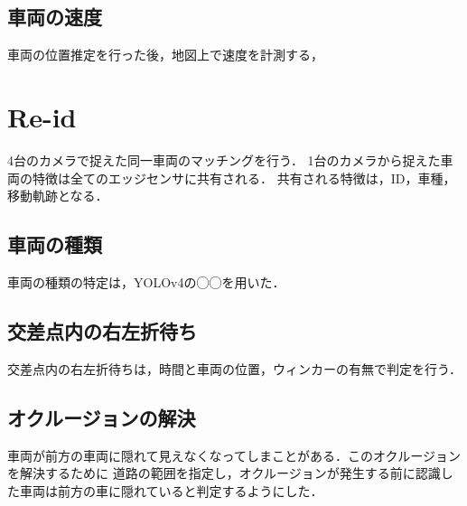 \subsection{車両の速度}
車両の位置推定を行った後，地図上で速度を計測する，

\section{Re-id}
4台のカメラで捉えた同一車両のマッチングを行う．
1台のカメラから捉えた車両の特徴は全てのエッジセンサに共有される．
共有される特徴は，ID，車種，移動軌跡となる．


\subsection{車両の種類}
車両の種類の特定は，YOLOv4の◯◯を用いた．
  
\subsection{交差点内の右左折待ち}
交差点内の右左折待ちは，時間と車両の位置，ウィンカーの有無で判定を行う．


\subsection{オクルージョンの解決}
車両が前方の車両に隠れて見えなくなってしまことがある．このオクルージョンを解決するために
道路の範囲を指定し，オクルージョンが発生する前に認識した車両は前方の車に隠れていると判定するようにした．

\newpage
